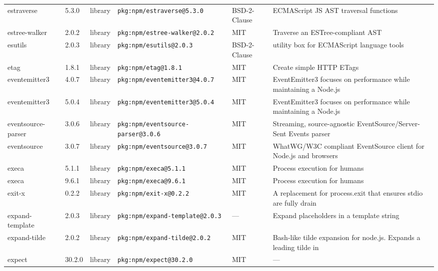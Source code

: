 \documentclass[11pt,a4paper]{article}
\begin{document}
\begin{longtable}{|p{4cm}|p{2cm}|p{1.6cm}|p{5cm}|p{1.5cm}|p{3.5cm}|}
\raggedright estraverse & 5.3.0 & library & \small\texttt{pkg:npm/estraverse@5.3.0} & BSD-2-Clause & \small ECMAScript JS AST traversal functions \\
\raggedright estree-walker & 2.0.2 & library & \small\texttt{pkg:npm/estree-walker@2.0.2} & MIT & \small Traverse an ESTree-compliant AST \\
\raggedright esutils & 2.0.3 & library & \small\texttt{pkg:npm/esutils@2.0.3} & BSD-2-Clause & \small utility box for ECMAScript language tools \\
\raggedright etag & 1.8.1 & library & \small\texttt{pkg:npm/etag@1.8.1} & MIT & \small Create simple HTTP ETags \\
\raggedright eventemitter3 & 4.0.7 & library & \small\texttt{pkg:npm/eventemitter3@4.0.7} & MIT & \small EventEmitter3 focuses on performance while maintaining a Node.js  \\
\raggedright eventemitter3 & 5.0.4 & library & \small\texttt{pkg:npm/eventemitter3@5.0.4} & MIT & \small EventEmitter3 focuses on performance while maintaining a Node.js  \\
\raggedright eventsource-parser & 3.0.6 & library & \small\texttt{pkg:npm/eventsource-parser@3.0.6} & MIT & \small Streaming, source-agnostic EventSource/Server-Sent Events parser \\
\raggedright eventsource & 3.0.7 & library & \small\texttt{pkg:npm/eventsource@3.0.7} & MIT & \small WhatWG/W3C compliant EventSource client for Node.js and browsers \\
\raggedright execa & 5.1.1 & library & \small\texttt{pkg:npm/execa@5.1.1} & MIT & \small Process execution for humans \\
\raggedright execa & 9.6.1 & library & \small\texttt{pkg:npm/execa@9.6.1} & MIT & \small Process execution for humans \\
\raggedright exit-x & 0.2.2 & library & \small\texttt{pkg:npm/exit-x@0.2.2} & MIT & \small A replacement for process.exit that ensures stdio are fully drain \\
\raggedright expand-template & 2.0.3 & library & \small\texttt{pkg:npm/expand-template@2.0.3} & — & \small Expand placeholders in a template string \\
\raggedright expand-tilde & 2.0.2 & library & \small\texttt{pkg:npm/expand-tilde@2.0.2} & MIT & \small Bash-like tilde expansion for node.js. Expands a leading tilde in \\
\raggedright expect & 30.2.0 & library & \small\texttt{pkg:npm/expect@30.2.0} & MIT & \small — \\

\end{longtable}
\end{document}
